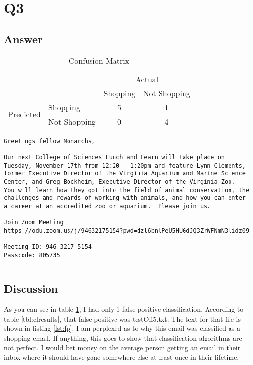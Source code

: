 \documentclass[12pt]{article}
\begin{document}
\section*{Q3}

\subsection*{Answer}

\begin{table}[h]
\centering
\caption{Confusion Matrix}
\label{tbl:confusion}
\begin{tabular}{l|l|c|c|}
\multicolumn{2}{c}{}&\multicolumn{2}{c}{Actual}\\
\cline{3-4}
\multicolumn{2}{c|}{}&Shopping&Not Shopping\\
\cline{2-4}
\multirow{2}{*}{Predicted}& Shopping & 5  & 1 \\
\cline{2-4}
& Not Shopping & 0  & 4  \\
\cline{2-4}
\end{tabular}
\end{table}

\begin{lstlisting}[caption=Text of testOff5.txt, label=lst:fp]
Greetings fellow Monarchs,

Our next College of Sciences Lunch and Learn will take place on Tuesday, November 17th from 12:20 - 1:20pm and feature Lynn Clements, former Executive Director of the Virginia Aquarium and Marine Science Center, and Greg Bockheim, Executive Director of the Virginia Zoo.  You will learn how they got into the field of animal conservation, the challenges and rewards of working with animals, and how you can enter a career at an accredited zoo or aquarium.  Please join us.

Join Zoom Meeting
https://odu.zoom.us/j/94632175154?pwd=dzl6bnlPeU5HUGdJQ3ZrWFNmN3lidz09

Meeting ID: 946 3217 5154
Passcode: 805735


\end{lstlisting}

\subsection*{Discussion}
As you can see in table \ref{tbl:confusion}, I had only 1 false positive classification.  According to table \ref{tbl:clresults}, that false positive was testOff5.txt.  The text for that file is shown in listing \ref{lst:fp}.  I am perplexed as to why this email was classified as a shopping email.  If anything, this goes to show that classification algorithms are not perfect.  I would bet money on the average person getting an email in their inbox where it should have gone somewhere else at least once in their lifetime.
\end{document}

